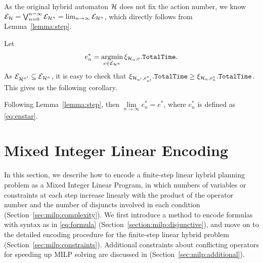 \documentclass[sigconf]{acmart}
\DeclareMathOperator*{\argmin}{argmin}
\begin{document}
As the original hybrid automaton $\mathcal{H}$ does not fix the action number, we know $\mathcal{E}_{\mathcal{H}}  = \bigvee_{n = 0}^{n=\infty} \mathcal{E}_{\mathcal{H}^n} = \lim_{n \rightarrow \infty}\mathcal{E}_{\mathcal{H}^n}$, which directly follows from Lemma~\ref{lemma:step}. 


Let 
\begin{equation}
\label{eq:enstar}
 e_n^* = \argmin\limits_{e \in \mathcal{E}_{\hybrid^{n}}} \xi_{\hybrid_n,e}.\mathtt{TotalTime}.   
\end{equation}
As $\mathcal{E}_{\mathcal{H}^{n'}} \subseteq \mathcal{E}_{\mathcal{H}^n}$, it is easy to check that $\xi_{\mathcal{H}_{n'},e_{n'}^*}.\mathtt{TotalTime} \geq \xi_{\mathcal{H}_n,e_n^*}.\mathtt{TotalTime}$. This gives us the following corollary.


\begin{corollary}
Following Lemma~\ref{lemma:step}, then $\lim\limits_{n \rightarrow \infty} e_n^* = e^*$, where $e_n^*$ is defined as \eqref{eq:enstar}.
\end{corollary}



\section{Mixed Integer Linear Encoding}
\label{section:milp}
In this section, we describe how to encode a finite-step linear hybrid planning problem as a Mixed Integer Linear Program, in which numbers of variables or constraints at each step increase linearly with the product of the operator number and the number of disjuncts involved in each condition (Section~\ref{sec:milp:complexity}). We first introduce a method to encode formulas with syntax as in \eqref{eq:formula} (Section~\ref{section:milp:disjunctive}), and move on to the detailed encoding procedure for the finite-step linear hybrid problem (Section~\ref{sec:milp:constraints}). Additional constraints about conflicting operators for speeding up MILP solving are discussed in (Section~\ref{sec:milp:additional}).
\end{document}
